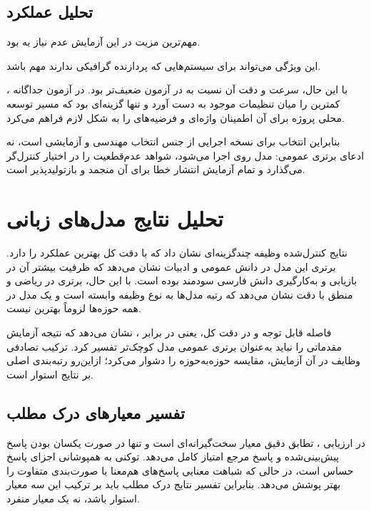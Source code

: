 \subsection{تحلیل عملکرد }

مهم‌ترین مزیت  در این آزمایش عدم نیاز به  بود.

این ویژگی می‌تواند برای سیستم‌هایی که پردازنده گرافیکی ندارند
مهم باشد.

با این حال، سرعت و دقت آن نسبت به  در آزمون
 ضعیف‌تر بود. در آزمون جداگانه ،
 کمترین  را میان تنظیمات موجود به دست آورد و
تنها گزینه‌ای بود که مسیر توسعه محلی پروژه برای آن اطمینان
واژه‌ای و فرضیه‌های  را به شکل لازم فراهم می‌کرد.

بنابراین انتخاب  برای نسخه اجرایی از جنس انتخاب
مهندسی و آزمایشی است، نه ادعای برتری عمومی: مدل روی 
اجرا می‌شود، شواهد عدم‌قطعیت را در اختیار کنترل‌گر می‌گذارد و
تمام آزمایش انتشار خطا برای آن منجمد و بازتولیدپذیر است.


\section{تحلیل نتایج مدل‌های زبانی}

نتایج کنترل‌شده وظیفه چندگزینه‌ای نشان داد که 
با دقت کل  بهترین عملکرد را دارد. برتری این مدل در
دانش عمومی و ادبیات نشان می‌دهد که ظرفیت بیشتر آن در بازیابی و
به‌کارگیری دانش فارسی سودمند بوده است. با این حال، برتری
 در ریاضی و منطق با دقت  نشان می‌دهد
که رتبه مدل‌ها به نوع وظیفه وابسته است و یک مدل در همه حوزه‌ها
لزوماً بهترین نیست.

فاصله قابل توجه  و  در دقت کل، یعنی
 در برابر ، نشان می‌دهد که نتیجه آزمایش
مقدماتی  را نباید به‌عنوان برتری عمومی مدل کوچک‌تر
تفسیر کرد. ترکیب تصادفی وظایف در آن آزمایش، مقایسه حوزه‌به‌حوزه را
دشوار می‌کرد؛ ازاین‌رو رتبه‌بندی اصلی بر نتایج  استوار است.


\subsection{تفسیر معیارهای درک مطلب}

در ارزیابی ، تطابق دقیق معیار سخت‌گیرانه‌ای است و
تنها در صورت یکسان بودن پاسخ پیش‌بینی‌شده و پاسخ مرجع امتیاز کامل
می‌دهد.  توکنی به همپوشانی اجزای پاسخ حساس است، در حالی که
شباهت معنایی پاسخ‌های هم‌معنا با صورت‌بندی متفاوت را بهتر پوشش
می‌دهد. بنابراین تفسیر نتایج درک مطلب باید بر ترکیب این سه معیار
استوار باشد، نه یک معیار منفرد.

